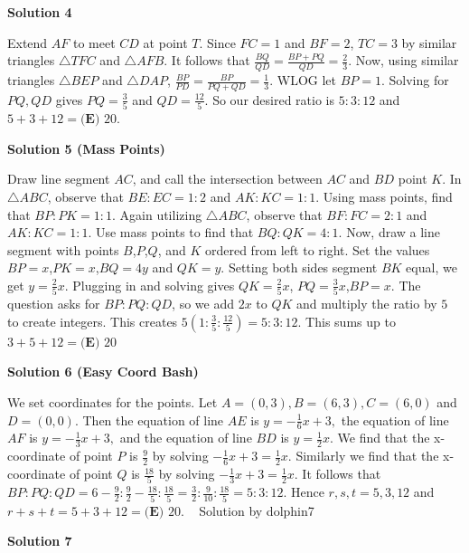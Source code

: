 \begin{enumerate}
 



\textbf{Solution 4}

Extend $AF$ to meet $CD$ at point $T$. Since $FC=1$ and $BF=2$, $TC=3$ by similar triangles $\triangle TFC$ and $\triangle AFB$. It follows that $\frac{BQ}{QD}=\frac{BP+PQ}{QD}=\frac{2}{3}$. Now, using similar triangles $\triangle BEP$ and $\triangle DAP$, $\frac{BP}{PD}=\frac{BP}{PQ+QD}=\frac{1}{3}$. WLOG let $BP=1$. Solving for $PQ, QD$ gives $PQ=\frac{3}{5}$ and $QD=\frac{12}{5}$. So our desired ratio is $5:3:12$ and $5+3+12=\boxed{\textbf{(E) } 20}$.

 



\textbf{Solution 5 (Mass Points)}

Draw line segment $AC$, and call the intersection between $AC$ and $BD$ point $K$. In $\triangle ABC$, observe that $BE:EC=1:2$ and $AK:KC=1:1$. Using mass points, find that $BP:PK=1:1$. Again utilizing $\triangle ABC$, observe that $BF:FC=2:1$ and $AK:KC=1:1$. Use mass points to find that $BQ:QK=4:1$. Now, draw a line segment with points $B$,$P$,$Q$, and $K$ ordered from left to right. Set the values $BP=x$,$PK=x$,$BQ=4y$ and $QK=y$. Setting both sides segment $BK$ equal, we get $y= \frac{2}{5}x$. Plugging in and solving gives $QK= \frac{2}{5}x$, $PQ=\frac{3}{5}x$,$BP=x$. The question asks for $BP:PQ:QD$, so we add $2x$ to $QK$ and multiply the ratio by $5$ to create integers. This creates $5(1:\frac{3}{5}:\frac{12}{5})= 5:3:12$. This sums up to $3+5+12=\boxed{\textbf{(E) }20}$




\textbf{Solution 6 (Easy Coord Bash)}

We set coordinates for the points. Let $A=(0,3),  B=(6,3), C=(6,0)$ and $D=(0,0)$. Then the equation of line $AE$ is $y = -\frac{1}{6}x + 3,$ the equation of line $AF$ is $y = -\frac{1}{3}x + 3,$ and the equation of line $BD$ is $y = \frac{1}{2}x$. We find that the x-coordinate of point $P$ is $\frac 9 2$ by solving $-\frac{1}{6}x + 3=\frac{1}{2}x.$ Similarly we find that the x-coordinate of point $Q$ is $\frac {18} 5$ by solving $-\frac{1}{3}x + 3=\frac{1}{2}x.$ It follows that $BP:PQ:QD=6-\frac 9 2 : \frac 9 2 - \frac {18} 5 : \frac {18} 5= \frac 3 2 : \frac 9 {10} : \frac {18} 5 = 5:3:12.$ Hence $r,s,t=5,3,12$ and $r+s+t=5+3+12=\boxed{\textbf{(E) } 20}.$ ~ Solution by dolphin7

 



\textbf{Solution 7}


\end{enumerate}
